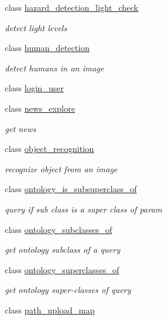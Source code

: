 \begin{DoxyCompactItemize}
class \hyperlink{classrapp_1_1cloud_1_1hazard__detection__light__check}{hazard\-\_\-detection\-\_\-light\-\_\-check}
\begin{DoxyCompactList}\small\item\em detect light levels \end{DoxyCompactList}\item 
class \hyperlink{classrapp_1_1cloud_1_1human__detection}{human\-\_\-detection}
\begin{DoxyCompactList}\small\item\em detect humans in an image \end{DoxyCompactList}\item 
class \hyperlink{classrapp_1_1cloud_1_1login__user}{login\-\_\-user}
\item 
class \hyperlink{classrapp_1_1cloud_1_1news__explore}{news\-\_\-explore}
\begin{DoxyCompactList}\small\item\em get news \end{DoxyCompactList}\item 
class \hyperlink{classrapp_1_1cloud_1_1object__recognition}{object\-\_\-recognition}
\begin{DoxyCompactList}\small\item\em recognize object from an image \end{DoxyCompactList}\item 
class \hyperlink{classrapp_1_1cloud_1_1ontology__is__subsuperclass__of}{ontology\-\_\-is\-\_\-subsuperclass\-\_\-of}
\begin{DoxyCompactList}\small\item\em query if sub class is a super class of param \end{DoxyCompactList}\item 
class \hyperlink{classrapp_1_1cloud_1_1ontology__subclasses__of}{ontology\-\_\-subclasses\-\_\-of}
\begin{DoxyCompactList}\small\item\em get ontology subclass of a query \end{DoxyCompactList}\item 
class \hyperlink{classrapp_1_1cloud_1_1ontology__superclasses__of}{ontology\-\_\-superclasses\-\_\-of}
\begin{DoxyCompactList}\small\item\em get ontology super-\/classes of query \end{DoxyCompactList}\item 
class \hyperlink{classrapp_1_1cloud_1_1path__upload__map}{path\-\_\-upload\-\_\-map}

\end{DoxyCompactItemize}
